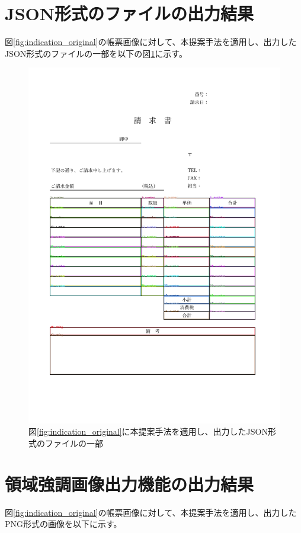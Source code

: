 \section{JSON形式のファイルの出力結果}\label{sec:result_json}
図\ref{fig:indication_original}の帳票画像に対して、本提案手法を適用し、出力したJSON形式のファイルの一部を以下の図\ref{fig:exported_json}に示す。

\begin{figure}[t]
    \begin{center}
        \includegraphics[width=15cm]{image/05-indication/rects_with_label.png}
        \caption{図\ref{fig:indication_original}に本提案手法を適用し、出力したJSON形式のファイルの一部}
        \label{fig:exported_json}
    \end{center}
\end{figure}


\section{領域強調画像出力機能の出力結果}\label{sec:result_OCR}
図\ref{fig:indication_original}の帳票画像に対して、本提案手法を適用し、出力したPNG形式の画像を以下に示す。

